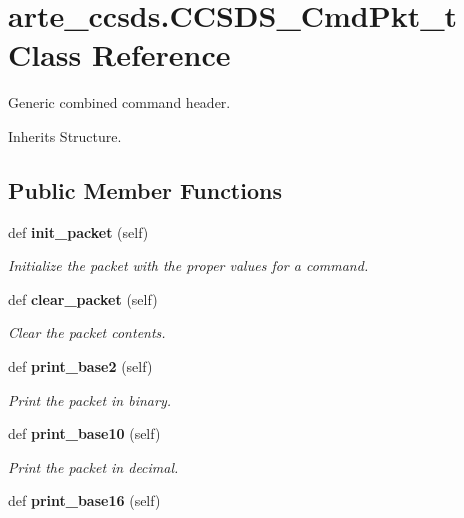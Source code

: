 \section{arte\+\_\+ccsds.\+C\+C\+S\+D\+S\+\_\+\+Cmd\+Pkt\+\_\+t Class Reference}
\label{classarte__ccsds_1_1_c_c_s_d_s___cmd_pkt__t}


Generic combined command header.  




Inherits Structure.

\subsection*{Public Member Functions}
\begin{DoxyCompactItemize}
\item 
def {\bf init\+\_\+packet} (self)
\begin{DoxyCompactList}\small\item\em Initialize the packet with the proper values for a command. \end{DoxyCompactList}\item 
def {\bf clear\+\_\+packet} (self)
\begin{DoxyCompactList}\small\item\em Clear the packet contents. \end{DoxyCompactList}\item 
def {\bf print\+\_\+base2} (self)
\begin{DoxyCompactList}\small\item\em Print the packet in binary. \end{DoxyCompactList}\item 
def {\bf print\+\_\+base10} (self)
\begin{DoxyCompactList}\small\item\em Print the packet in decimal. \end{DoxyCompactList}\item 
def {\bf print\+\_\+base16} (self)\label{classarte__ccsds_1_1_c_c_s_d_s___cmd_pkt__t_a30491d0fbd434672690aa677c27b4e9a}


\end{DoxyCompactItemize}
